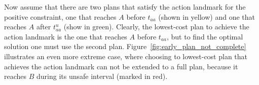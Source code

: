 \documentclass[letterpaper]{article} %
\newcommand{\ccbs}{\ac{CCBS}\xspace}
\begin{document}
Now assume that there are two plans that satisfy the action landmark for the positive constraint, one that reaches $A$ before $t_{aa}$ (shown in yellow) and one that reaches $A$ after $t_{aa}^u$ (show in green).
Clearly, the lowest-cost plan to achieve the action landmark is the one that reaches $A$ before $t_{aa}$, but to find the optimal solution one must use the second plan.
Figure~\ref{fig:early_plan_not_complete} illustrates an even more extreme case, where choosing to lowest-cost plan that achieves the action landmark can not be extended to a full plan, because it reaches $B$ during its unsafe interval (marked in red).





\end{document}
